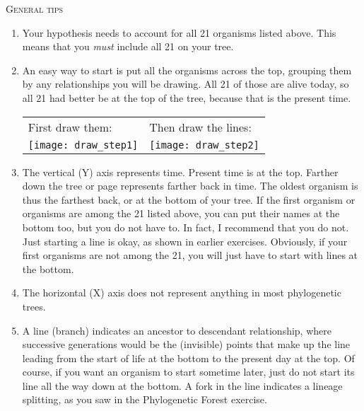 \documentclass[12pt]{exam}
\begin{document}
\vspace*{\baselineskip}

\noindent\textsc{General tips}

\begin{enumerate}

\item
  Your hypothesis needs to account for all 21
  organisms listed above. This means that you \emph{must} include
  all 21 on your tree.

\item
  An easy way to start is put all the organisms across the top, grouping
  them by any relationships you will be drawing. All 21 of those are
  alive today, so all 21 had better be at the top of the tree, because
  that is the present time. 


\begin{longtable}[c]{@{}ll@{}}

First draw them: & Then draw the lines:\tabularnewline
%
\texttt{[image: draw\_step1]} &
\texttt{[image: draw\_step2]} \tabularnewline
%
\end{longtable}


\item
  The vertical (Y) axis represents time. Present time is at the top. Farther
  down the tree or page represents farther back in time. The oldest
  organism is thus the farthest back, or at the bottom of your tree. If
  the first organism or organisms are among the 21 listed above,
  you can put their names at the bottom too, but you do not have to. In
  fact, I recommend that you do not. Just starting a line is okay, as
  shown in earlier exercises. Obviously, if your first organisms are 
  not among the 21, you will just have to start with lines at the bottom.

\item The horizontal (X) axis does not represent anything in most phylogenetic trees.

\item
  A line (branch) indicates an ancestor to descendant relationship, where
  successive generations would be the (invisible) points that make up
  the line leading from the start of life at the bottom to the present
  day at the top. Of course, if you want an organism to start sometime
  later, just do not start its line all the way down at the bottom. A
  fork in the line indicates a lineage splitting, as you saw in the 
  Phylogenetic Forest exercise.


\end{enumerate}
\end{document}
